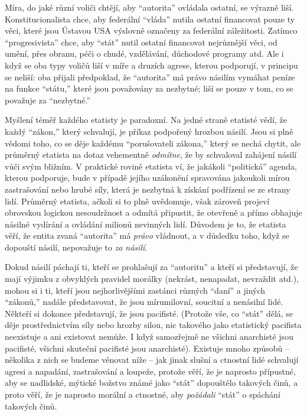 \documentclass{book}
\begin{document}
Míra, do jaké různí voliči chtějí, aby \enquote{autorita} ovládala ostatní, se výrazně liší. Konstitucionalista chce, aby federální \enquote{vláda} nutila ostatní financovat pouze ty věci, které jsou Ústavou USA výslovně označeny za federální záležitosti. Zatímco \enquote{progresivista} chce, aby \enquote{stát} nutil ostatní financovat nejrůznější věci, od umění, přes obranu, péči o chudé, vzdělávání, důchodové programy atd. Ale i když se oba typy voličů liší v míře a druzích agrese, kterou podporují, v principu se neliší: oba přijali předpoklad, že \enquote{autorita} má právo násilím vymáhat peníze na funkce \enquote{státu,} které jsou považovány za nezbytné; liší se pouze v tom, co se považuje za \enquote{nezbytné.}

Myšlení téměř každého etatisty je paradoxní. Na jedné straně etatisté vědí, že každý \enquote{zákon,} který schvalují, je příkaz podpořený hrozbou násilí. Jsou si plně vědomi toho, co se děje každému \enquote{porušovateli zákona,} který se nechá chytit, ale průměrný etatista na dotaz vehementně \emph{odmítne}, že by schvaloval zahájení násilí vůči svým bližním. V praktické rovině etatista ví, že jakákoli \enquote{politická} agenda, kterou podporuje, bude v případě jejího uzákonění spravována jakoukoli mírou zastrašování nebo hrubé síly, která je nezbytná k získání podřízení se ze strany lidí. Průměrný etatista, ačkoli si to plně uvědomuje, však zároveň projeví obrovskou logickou nesoudržnost a odmítá připustit, že otevřeně a přímo obhajuje násilné vydírání a ovládání milionů nevinných lidí. Důvodem je to, že etatista věří, že entita zvaná \enquote{autorita} má \emph{právo} vládnout, a v důsledku toho, když se dopouští násilí, nepovažuje to \emph{za násilí}.

Dokud násilí páchají ti, kteří se prohlašují za \enquote{autoritu} a kteří si představují, že mají výjimku z obvyklých pravidel morálky (nekrást, nenapadat, nevraždit atd.), mohou si i ti, kteří jsou nejhorlivějšími zastánci různých \enquote{daní} a jiných \enquote{zákonů,} nadále představovat, že jsou mírumilovní, soucitní a nenásilní lidé. Někteří si dokonce představují, že jsou pacifisté. (Protože vše, co \enquote{stát} dělá, se děje prostřednictvím síly nebo hrozby silou, nic takového jako etatistický pacifista neexistuje a ani existovat nemůže. I když samozřejmě ne všichni anarchisté jsou pacifisté, všichni skuteční pacifisté jsou anarchisté). Existuje mnoho způsobů -- několika z nich se budeme věnovat níže -- jak jinak slušní a ctnostní lidé schvalují agresi a napadání, zastrašování a loupeže, protože věří, že je naprosto přípustné, aby se nadlidské, mýtické božstvo známé jako \enquote{stát} dopouštělo takových činů, a proto věří, že je naprosto morální a ctnostné, aby \emph{požádali} \enquote{stát} o spáchání takových činů.
\end{document}
